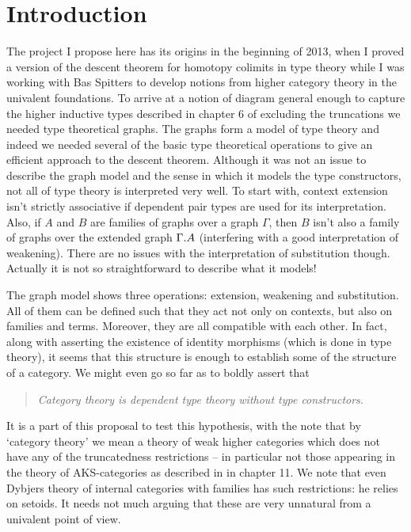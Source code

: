 \section{Introduction}
The project I propose here has its origins in the beginning of 2013, when I proved a version
of the descent theorem for homotopy colimits in type theory while I was working
with Bas Spitters to develop notions from higher category theory in the
univalent foundations. To arrive at a
notion of diagram general enough to capture the higher inductive types described
in chapter 6 of \cite{TheBook} excluding the truncations we needed type
theoretical graphs. The graphs form a model of type theory and indeed we needed
several of the basic type theoretical operations to give an efficient approach
to the descent theorem. Although it was not an issue to describe the graph model
and the sense in which it models the type constructors, 
not all of type theory is interpreted very well. To start with, context
extension isn't strictly associative if dependent pair types are used for
its interpretation. Also, if $A$ and $B$ are families of graphs
over a graph $\Gamma$, then $B$ isn't also a family of graphs over the extended
graph $\ctxext{\Gamma}{A}$ (interfering with a good interpretation of weakening).
There are no issues with the interpretation of substitution though. Actually
it is not so straightforward to describe what it models!

The graph model
shows three operations: extension, weakening and substitution. All of them
can be defined such that they act not only on contexts, but also on families
and terms. Moreover, they are all compatible with each other. In fact, along
with asserting the existence of identity morphisms (which is done in type
theory), it seems
that this structure is enough to establish some of the structure of a category.
We might even go so far as to boldly assert that
\begin{quote}
\emph{Category theory is dependent type theory without type constructors.}
\end{quote}
It is a part of this proposal to test this hypothesis, with the note that by
`category theory' we mean a theory of weak higher categories which does not
have any of the truncatedness restrictions -- in particular not those appearing
in the theory of AKS-categories as
described in \cite{TheBook} in chapter 11. We note that even Dybjers theory
of internal categories with families has such restrictions: he relies on setoids.
It needs not much arguing that these are very unnatural from a univalent point
of view.

